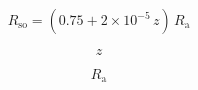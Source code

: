 \documentclass[preview,border=2pt]{standalone}
\begin{document}
\[
R_\mathrm{so}=(0.75+2\times10^{-5}\,z)\,R_\mathrm{a}
\]

\[
z
\]

\[
R_\mathrm{a}
\]
\end{document}
